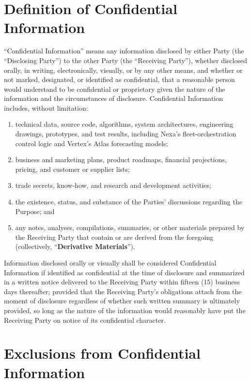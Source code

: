 \section{Definition of Confidential Information}

``Confidential Information'' means any information disclosed by either Party (the ``Disclosing Party'') to the other Party (the ``Receiving Party''), whether disclosed orally, in writing, electronically, visually, or by any other means, and whether or not marked, designated, or identified as confidential, that a reasonable person would understand to be confidential or proprietary given the nature of the information and the circumstances of disclosure. Confidential Information includes, without limitation:

\begin{enumerate}
  \item technical data, source code, algorithms, system architectures, engineering drawings, prototypes, and test results, including Nexa's fleet-orchestration control logic and Vertex's Atlas forecasting models;
  \item business and marketing plans, product roadmaps, financial projections, pricing, and customer or supplier lists;
  \item trade secrets, know-how, and research and development activities;
  \item the existence, status, and substance of the Parties' discussions regarding the Purpose; and
  \item any notes, analyses, compilations, summaries, or other materials prepared by the Receiving Party that contain or are derived from the foregoing (collectively, ``\textbf{Derivative Materials}'').
\end{enumerate}

Information disclosed orally or visually shall be considered Confidential Information if identified as confidential at the time of disclosure and summarized in a written notice delivered to the Receiving Party within fifteen (15) business days thereafter; provided that the Receiving Party's obligations attach from the moment of disclosure regardless of whether such written summary is ultimately provided, so long as the nature of the information would reasonably have put the Receiving Party on notice of its confidential character.

\section{Exclusions from Confidential Information}


